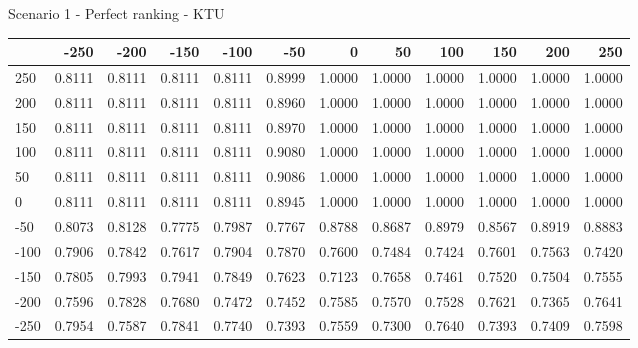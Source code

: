 Scenario 1 - Perfect ranking - KTU
\begin{tabular}{lrrrrrrrrrrr}
\toprule
{} &   -250 &   -200 &   -150 &   -100 &   -50  &    0   &    50  &    100 &    150 &    200 &    250 \\
\midrule
 250 & 0.8111 & 0.8111 & 0.8111 & 0.8111 & 0.8999 & 1.0000 & 1.0000 & 1.0000 & 1.0000 & 1.0000 & 1.0000 \\
 200 & 0.8111 & 0.8111 & 0.8111 & 0.8111 & 0.8960 & 1.0000 & 1.0000 & 1.0000 & 1.0000 & 1.0000 & 1.0000 \\
 150 & 0.8111 & 0.8111 & 0.8111 & 0.8111 & 0.8970 & 1.0000 & 1.0000 & 1.0000 & 1.0000 & 1.0000 & 1.0000 \\
 100 & 0.8111 & 0.8111 & 0.8111 & 0.8111 & 0.9080 & 1.0000 & 1.0000 & 1.0000 & 1.0000 & 1.0000 & 1.0000 \\
 50  & 0.8111 & 0.8111 & 0.8111 & 0.8111 & 0.9086 & 1.0000 & 1.0000 & 1.0000 & 1.0000 & 1.0000 & 1.0000 \\
 0   & 0.8111 & 0.8111 & 0.8111 & 0.8111 & 0.8945 & 1.0000 & 1.0000 & 1.0000 & 1.0000 & 1.0000 & 1.0000 \\
-50  & 0.8073 & 0.8128 & 0.7775 & 0.7987 & 0.7767 & 0.8788 & 0.8687 & 0.8979 & 0.8567 & 0.8919 & 0.8883 \\
-100 & 0.7906 & 0.7842 & 0.7617 & 0.7904 & 0.7870 & 0.7600 & 0.7484 & 0.7424 & 0.7601 & 0.7563 & 0.7420 \\
-150 & 0.7805 & 0.7993 & 0.7941 & 0.7849 & 0.7623 & 0.7123 & 0.7658 & 0.7461 & 0.7520 & 0.7504 & 0.7555 \\
-200 & 0.7596 & 0.7828 & 0.7680 & 0.7472 & 0.7452 & 0.7585 & 0.7570 & 0.7528 & 0.7621 & 0.7365 & 0.7641 \\
-250 & 0.7954 & 0.7587 & 0.7841 & 0.7740 & 0.7393 & 0.7559 & 0.7300 & 0.7640 & 0.7393 & 0.7409 & 0.7598 \\
\bottomrule
\end{tabular}

